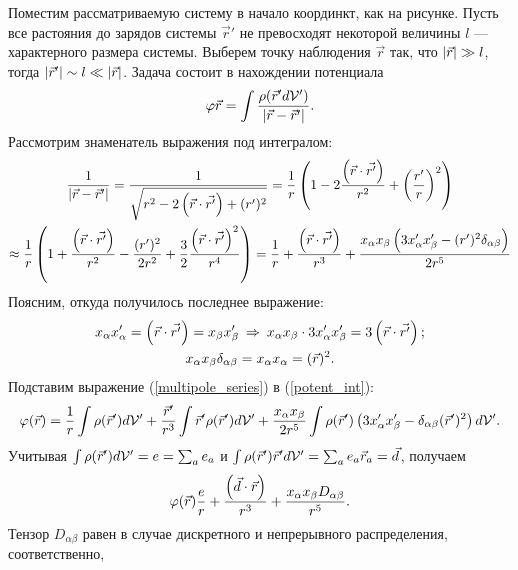     Поместим рассматриваемую систему в начало координкт, как на рисунке. Пусть все растояния до зарядов системы $\vec{r}'$ не превосходят некоторой величины $l$ ---
    характерного размера системы. Выберем точку наблюдения $\vec{r}$ так, что $\left|{\vec{r}}\right| \gg l$, тогда $\left|{\vec{r}'}\right| \sim l \ll \left|{\vec{r}}\right|$. Задача состоит в
    нахождении потенциала
    \begin{equation}
        \varphi{\vec{r}} = \int \frac{\rho(\vec{r}' d\mathcal{V}')}{\left|{\vec{r} - \vec{r}'}\right|}. \label{potent_int}
    \end{equation}
    Рассмотрим знаменатель выражения под интегралом:
    \begin{gather}
        \frac{1}{\left|{\vec{r} - \vec{r}'}\right|} = \frac{1}{\sqrt{r^2 - 2\left({\vec{r}\cdot\vec{r'}}\right) + (r')^2}} = \frac{1}{r} \left({1 - 2\frac{\left({\vec{r}\cdot\vec{r'}}\right)}{r^2} + \left({\frac{r'}{r}}\right)^2}\right) \\
        \approx \frac{1}{r}\left({1 + \frac{\left({\vec{r}\cdot\vec{r'}}\right)}{r^2} - \frac{(r')^2}{2r^2} + \frac{3}{2} \frac{\left({\vec{r}\cdot\vec{r'}}\right)^2}{r^4}}\right) = 
        \frac{1}{r} + \frac{\left({\vec{r}\cdot\vec{r'}}\right)}{r^3} + \frac{x_{\alpha} x_{\beta} \left({3x_{\alpha}'x_{\beta}' - (r')^2 \delta_{\alpha\beta}}\right)}{2r^5} \label{multipole_series}
    \end{gather}
    Поясним, откуда получилось последнее выражение:
    \begin{gather*}
        x_{\alpha}x_{\alpha}' = \left({\vec{r}\cdot\vec{r'}}\right) = x_{\beta}x_{\beta}' \: \Rightarrow \: x_{\alpha}x_{\beta} \cdot 3x_{\alpha}'x_{\beta}' = 3\left({\vec{r}\cdot\vec{r'}}\right);\\
        x_{\alpha} x_{\beta}\delta_{\alpha\beta} = x_{\alpha}x_{\alpha} = (\vec{r})^2.
    \end{gather*}
    Подставим выражение (\ref{multipole_series}) в (\ref{potent_int}):
    \begin{gather*}
        \varphi(\vec{r}) = \frac 1r \int \rho(\vec{r}') d\mathcal{V}' + \frac{\vec{r}'}{r^3}\int \vec{r}'\rho(\vec{r}') d\mathcal{V}' + \frac{x_{\alpha}x_{\beta}}{2r^5}\int\rho(\vec{r}')
        \left({3x_{\alpha}'x_{\beta}' - \delta_{\alpha\beta}(\vec{r}')^2}\right)d\mathcal{V}'.
    \end{gather*}
    Учитывая $\int \rho(\vec{r}') d\mathcal{V}' = e = \sum_a e_a$ и $\int \rho(\vec{r}') \vec{r}' d\mathcal{V}' = \sum_a e_a\vec{r}_a = \vec{d}$, получаем
    \begin{equation}
        \varphi(\vec{r}) \frac er + \frac{\left({\vec{d}\cdot\vec{r}}\right)}{r^3} + \frac{x_{\alpha}x_{\beta} D_{\alpha\beta}}{r^5}. \label{quad_potent}
    \end{equation}
    Тензор $D_{\alpha\beta}$ равен в случае дискретного и непрерывного распределения, соответственно,
